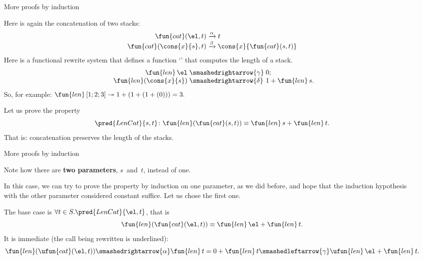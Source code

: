 %
\begin{frame}{More proofs by induction}

  Here is again the concatenation of two stacks:
  \begin{align*}
    \fun{cat}(        \el,t) &\xrightarrow{\alpha} t\\
    \fun{cat}(\cons{x}{s},t) &\xrightarrow{\smash{\beta}}
    \cons{x}{\fun{cat}(s,t)}
  \end{align*}
  Here is a functional rewrite system that defines a function
  `' that computes the length of a stack.
  \begin{equation*}
    \begin{array}{r@{\;}l@{\;}l@{}}
      \fun{len}\,\el & \smashedrightarrow{\gamma} & 0;\\
      \fun{len}(\cons{x}{s}) & \smashedrightarrow{\delta}
      & 1 + \fun{len}\, s.
    \end{array}
  \end{equation*}
  So, for example: \(\fun{len}\,[1;2;3] \twoheadrightarrow 1 + (1 + (1
  + (0))) = 3.\)

  \bigskip

  Let us prove the property
  \begin{equation*}
    \pred{LenCat}{s,t} \colon \fun{len}(\fun{cat}(s, t)) \equiv
    \fun{len}\,s + \fun{len}\,t.
  \end{equation*}
  That is: concatenation preserves the length of the stacks.

\end{frame}

%
\begin{frame}{More proofs by induction}

  Note how there are \textbf{two parameters}, \(s\)~and~\(t\), instead
  of one.

  \bigskip

  In this case, we can try to prove the property by induction on one
  parameter, as we did before, and hope that the induction hypothesis
  with the other parameter considered constant suffice. Let us chose
  the first one.

  \bigskip

  The base case is \(\forall t \in S.\pred{LenCat}{\el,t}\), that is
  \[\fun{len}(\fun{cat}(\el,t)) \equiv \fun{len}\,\el +
  \fun{len}\,t.\] It is immediate (the call being rewritten is
  underlined):
  \begin{equation*}
    \fun{len}(\ufun{cat}(\el,t)) \smashedrightarrow{\alpha}
    \fun{len}\,t = 0 + \fun{len}\,t
    \smashedleftarrow{\gamma} \ufun{len}\,\el + \fun{len}\,t.
  \end{equation*}

\end{frame}

